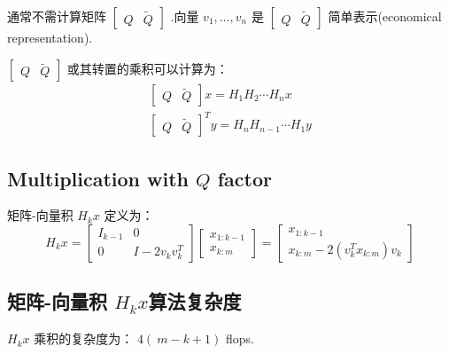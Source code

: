 通常不需计算矩阵 $ \left[\begin{array}{ll}Q & \tilde{Q}\end{array}\right] $ .向量 $ v_{1}, \ldots, v_{n} $ 是 $ \left[\begin{array}{ll}Q & \tilde{Q}\end{array}\right] $ 简单表示(economical representation).

\begin{theorem}
    $ \left[\begin{array}{ll}Q & \tilde{Q}\end{array}\right] $ 或其转置的乘积可以计算为：
$$
\begin{array}{c}
{\left[\begin{array}{cc}
Q & \tilde{Q}
\end{array}\right] x=H_{1} H_{2} \cdots H_{n} x} \\
{\left[\begin{array}{ll}
Q & \tilde{Q}
\end{array}\right]^{T} y=H_{n} H_{n-1} \cdots H_{1} y}
\end{array}
$$
\end{theorem}

\subsection{Multiplication with $Q$ factor}

\begin{definition}[矩阵-向量积 $ H_{k} x $]
    矩阵-向量积 $ H_{k} x $ 定义为：
$$
H_{k} x=\left[\begin{array}{cc}
I_{k-1} & 0 \\
0 & I-2 v_{k} v_{k}^{T}
\end{array}\right]\left[\begin{array}{c}
x_{1: k-1} \\
x_{k: m}
\end{array}\right]=\left[\begin{array}{c}
x_{1: k-1} \\
x_{k: m}-2\left(v_{k}^{T} x_{k: m}\right) v_{k}
\end{array}\right]
$$
\end{definition}

\subsection{矩阵-向量积 $ H_{k} x $算法复杂度}

$ H_{k} x $ 乘积的复杂度为： $ 4( {~m}- {k}+1) $ flops.

